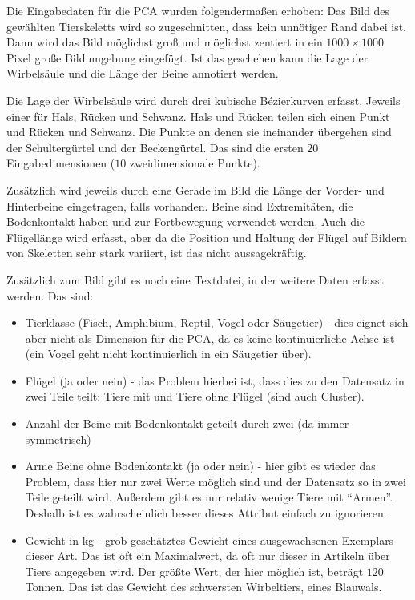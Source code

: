  
 
 Die Eingabedaten für die PCA wurden folgendermaßen erhoben:
 Das Bild des gewählten Tierskeletts wird so zugeschnitten, dass kein unnötiger Rand dabei ist. Dann wird das Bild möglichst groß und möglichst zentiert in ein $1000 \times 1000$ Pixel große Bildumgebung eingefügt.
 Ist das geschehen kann die Lage der Wirbelsäule und die Länge der Beine annotiert werden.
 
 Die Lage der Wirbelsäule wird durch drei kubische Bézierkurven erfasst. Jeweils einer für Hals, Rücken und Schwanz. Hals und Rücken teilen sich einen Punkt und Rücken und Schwanz. Die Punkte an denen sie ineinander übergehen sind der Schultergürtel und der Beckengürtel.
 Das sind die ersten $20$ Eingabedimensionen ($10$ zweidimensionale Punkte).
 
 Zusätzlich wird jeweils durch eine Gerade im Bild die Länge der Vorder- und Hinterbeine eingetragen, falls vorhanden. Beine sind Extremitäten, die Bodenkontakt haben und zur Fortbewegung verwendet werden.  Auch die Flügellänge wird erfasst, aber da die Position und Haltung der Flügel auf Bildern von Skeletten sehr stark variiert, ist das nicht aussagekräftig.
 
 Zusätzlich zum Bild gibt es noch eine Textdatei, in der weitere Daten erfasst werden. Das sind:
 \begin{itemize}
  \item Tierklasse (Fisch, Amphibium, Reptil, Vogel oder Säugetier) - dies eignet sich aber nicht als Dimension für die PCA, da es keine kontinuierliche Achse ist (ein Vogel geht \zb nicht kontinuierlich in ein Säugetier über).
  
  \item Flügel (ja oder nein) - das Problem hierbei ist, dass dies zu den Datensatz in zwei Teile teilt: Tiere mit und Tiere ohne Flügel (sind auch Cluster).
  
  \item Anzahl der Beine mit Bodenkontakt geteilt durch zwei (da immer symmetrisch)
  
  \item Arme \bzw Beine ohne Bodenkontakt (ja oder nein) - hier gibt es wieder das Problem, dass hier nur zwei Werte möglich sind und der Datensatz so in zwei Teile geteilt wird. Außerdem gibt es nur relativ wenige Tiere mit "`Armen"'. Deshalb ist es wahrscheinlich besser dieses Attribut einfach zu ignorieren.
  
  \item Gewicht in kg - grob geschätztes Gewicht eines ausgewachsenen Exemplars dieser Art. Das ist oft ein Maximalwert, da oft nur dieser in Artikeln über Tiere angegeben wird. Der größte Wert, der hier möglich ist, beträgt $120$ Tonnen. Das ist das Gewicht des schwersten Wirbeltiers, eines Blauwals. 
 \end{itemize}

